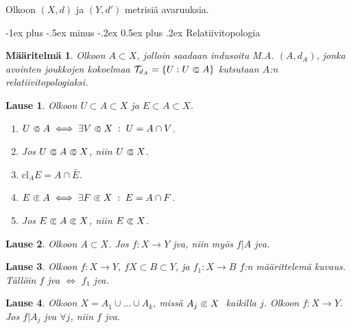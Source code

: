 \documentclass[landscape,a4paper,10pt]{article}
\makeatletter
\renewcommand{\section}{\@startsection{section}{1}{0mm}%
                                {-1ex plus -.5ex minus -.2ex}%
                                {0.5ex plus .2ex}%
                                {\color{blue}\normalfont\large\bfseries}}
\newcommand\opn{\mathrel{\ooalign{$\subset$\cr
  \hidewidth\hbox{$\circ\mkern.5mu$}\cr}}}
\newcommand\cls{\mathrel{\ooalign{$\subset$\cr
\hidewidth\raise.225ex\hbox{$\text{{\scriptsize c}}\mkern2mu$}\cr}}}
\theoremstyle{customtheoremstyle}
\newtheorem*{theorem}{Lause}
\newtheorem*{definition}{Määritelmä}
\makeatother
\begin{document}
\begin{multicols*}{3}

Olkoon $(X,d)$ ja $(Y,d')$ metrisiä avaruuksia.

\section{Relatiivitopologia}

\begin{definition}
  Olkoon $A \subset X$, jolloin saadaan indusoitu M.A. $(A,d_A)$, jonka
  avointen joukkojen kokoelmaa $\mathcal{T}_{d_A} = \{ U : U \opn A \}$
  kutsutaan $A$:n relatiivitopologiaksi.
\end{definition}


\begin{theorem}
  Olkoon $U \subset A \subset X$ ja $E \subset A \subset X$.
  \begin{enumerate}
    \item{$U \opn A \iff \exists V \opn X \;:\; U = A \cap V$.}
    \item{Jos $U \opn A \opn X$, niin $U \opn X$.}
    \item{$\text{cl}_A E = A \cap \bar{E}$.}
    \item{$E \cls A \iff \exists F \cls X \;:\; E = A \cap F$.}
    \item{Jos $E \cls A \cls X$, niin $E \cls X$.}
  \end{enumerate}
\end{theorem}

\begin{theorem}
  Olkoon $A \subset X$. Jos $f: X \rightarrow Y$ jva, niin myös $f|A$ jva.
\end{theorem}

\begin{theorem}
  Olkoon $f: X \rightarrow Y$, $f X \subset B \subset Y$, ja $f_1 : X
  \rightarrow B$ $f$:n määrittelemä kuvaus. Tällöin $f$ jva $\iff$ $f_1$ jva.
\end{theorem}

\begin{theorem}
  Olkoon $X = A_1 \cup ... \cup A_k$, missä $A_j \cls X \;$ kaikilla $j$.
  Olkoon $f: X \rightarrow Y$. Jos $f|A_j$ jva $\forall j$, niin
  $f$ jva.
\end{theorem}



\end{multicols*}
\end{document}
